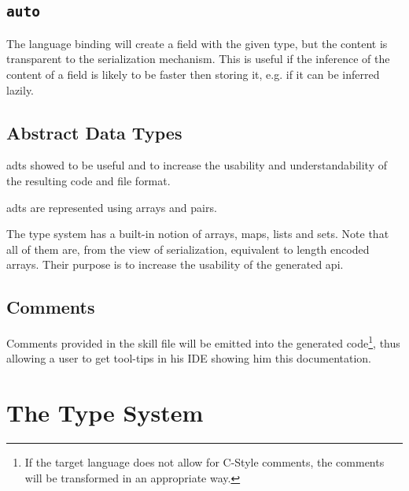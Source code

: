 \documentclass[a4paper,10pt]{article}
\begin{document}
\subsection{\texttt{auto}}
The language binding will create a field with the given type, but the content is transparent to the serialization mechanism. This is useful if the inference of the content of a field is likely to be faster then storing it, e.g. if it can be inferred lazily.

\subsection{Abstract Data Types}

\glspl{adt} showed to be useful and to increase the usability and understandability of the resulting code and file format.

\glspl{adt} are represented using arrays and pairs. 

The type system has a built-in notion of arrays, maps, lists and sets. Note that all of them are, from the view of serialization, equivalent to length encoded arrays. Their purpose is to increase the usability of the generated \gls{api}.


\subsection{Comments}
Comments provided in the skill file will be emitted into the generated code\footnote{If the target language does not allow for C-Style comments, the comments will be transformed in an appropriate way.}, thus allowing a user to get tool-tips in his IDE showing him this documentation. 



\section{The Type System}

\end{document}
